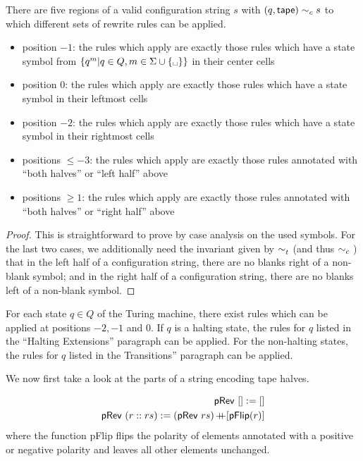 \documentclass[a4paper,UKenglish,cleveref, autoref]{lipics-v2019}
\begin{document}
\begin{lemma}
  There are five regions of a valid configuration string $s$ with $(q, \textsf{tape}) \sim_c{} s$ to which different sets of rewrite rules can be applied.
  \begin{itemize}
    \item position $-1$: the rules which apply are exactly those rules which have a state symbol from $\{q^m | q \in Q, m \in \Sigma \cup \{\blank \}\}$ in their center cells
    \item position $0$: the rules which apply are exactly those rules which have a state symbol in their leftmost cells
    \item position $-2$: the rules which apply are exactly those rules which have a state symbol in their rightmost cells
    \item positions $\le -3$: the rules which apply are exactly those rules annotated with  ``both halves'' or ``left half'' above
    \item positions $\ge 1$: the rules which apply are exactly those rules annotated with ``both halves'' or ``right half'' above
  \end{itemize}
\end{lemma}
\begin{proof}
  This is straightforward to prove by case analysis on the used symbols. For the last two cases, we additionally need the invariant given by $\sim_t^{}$ (and thus $\sim_c{}$) that in the left half of a configuration string, there are no blanks right of a non-blank symbol; and in the right half of a configuration string, there are no blanks left of a non-blank symbol.
\end{proof}

\begin{lemma}
  For each state $q \in Q$ of the Turing machine, there exist rules which can be applied at positions $-2, -1$ and $0$. If $q$ is a halting state, the rules for $q$ listed in the ``Halting Extensions'' paragraph can be applied. For the non-halting states, the rules for $q$ listed in the Transitions'' paragraph can be applied.
\end{lemma}

We now first take a look at the parts of a string encoding tape halves.

\begin{definition}
  \begin{align*}
    \textsf{pRev}~[] := [] \\
    \textsf{pRev}~(r::rs) :=  (\textsf{pRev}~rs) \mathop{{+}\!\!\!{+}} [\textsf{pFlip}(r)]
  \end{align*}
  where the function \textsf{pFlip} flips the polarity of elements annotated with a positive or negative polarity and leaves all other elements unchanged.
\end{definition}
\end{document}
